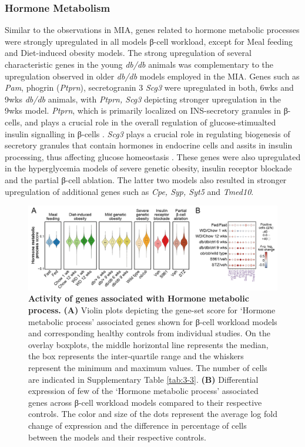 
\subsubsection{Hormone Metabolism}
\label{subsec:hormone}
Similar to the observations in MIA, genes related to hormone metabolic processes were strongly upregulated in all models β-cell workload, except for Meal feeding and Diet-induced obesity models. The strong upregulation of several characteristic genes in the young \textit{db/db} animals was complementary to the upregulation observed in older \textit{db/db} models employed in the MIA. Genes such as \textit{Pam}, phogrin (\textit{Ptprn}), secretogranin 3 \textit{Scg3} were upregulated in both, 6wks and 9wks \textit{db/db} animals, with \textit{Ptprn, Scg3} depicting stronger upregulation in the 9wks model. \textit{Ptprn}, which is primarily localized on INS-secretory granules in β-cells, and plays a crucial role in the overall regulation of glucose-stimualted insulin signalling in β-cells \textbf{\cite{https://www.ncbi.nlm.nih.gov/pmc/articles/PMC5912479/}}. \textit{Scg3} plays a crucial role in regulating biogenesis of secretory granules that contain hormones in endocrine cells and assits in insulin processing, thus affecting glucose homeostasis \textbf{\cite{https://www.ncbi.nlm.nih.gov/pmc/articles/PMC6780385/}}. These genes were also upregulated in the hyperglycemia models of severe genetic obesity, insulin receptor blockade and the partial β-cell ablation. The latter two models also resulted in stronger upregulation of additional genes such as \textit{Cpe, Syp, Syt5} and \textit{Tmed10}.

\begin{figure}[t]
\centering
\includegraphics[width=\linewidth]{Chapter5/Fig/F3-13-02.png}
\caption[Gene-set scoring of `\textit{Hormone metabolic process}']{\textbf{Activity of genes associated with Hormone metabolic process.} \textbf{(A)} Violin plots depicting the gene-set score for `Hormone metabolic process' associated genes shown for β-cell workload models and corresponding healthy controls from individual studies. On the overlay boxplots, the middle horizontal line represents the median, the box represents the inter-quartile range and the whiskers represent the minimum and maximum values. The number of cells are indicated in Supplementary Table \ref{tab:3-3}. \textbf{(B)} Differential expression of few of the `Hormone metabolic process' associated genes across β-cell workload models compared to their respective controls. The color and size of the dots represent the average log fold change of expression and the difference in percentage of cells between the models and their respective controls.}
\label{fig:3-13-2}
\end{figure}


